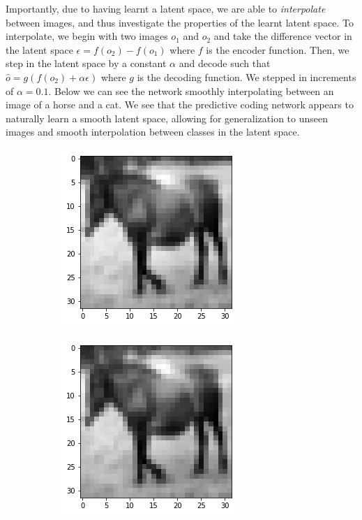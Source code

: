 Importantly, due to having learnt a latent space, we are able to \emph{interpolate} between images, and thus investigate the properties of the learnt latent space. To interpolate, we begin with two images $o_1$ and $o_2$ and take the difference vector in the latent space $\epsilon = f(o_2) - f(o_1)$ where $f$ is the encoder function. Then, we step in the latent space by a constant $\alpha$ and decode such that $\hat{o} = g(f(o_2) + \alpha \epsilon)$ where $g$ is the decoding function. We stepped in increments of $\alpha = 0.1$. Below we can see the network smoothly interpolating between an image of a horse and a cat. We see that the predictive coding network appears to naturally learn a smooth latent space, allowing for generalization to unseen images and smooth interpolation between classes in the latent space.
\begin{figure}[H]
\centering
\begin{subfigure}{.3\linewidth}
    \centering
    \includegraphics[scale=0.4]{chapter_3_figures/interp_2.png}
\end{subfigure}
    \hfill
\begin{subfigure}{.3\linewidth}
    \centering
    \includegraphics[scale=0.4]{chapter_3_figures/interp_3.png}

\end{subfigure}
\end{figure}
